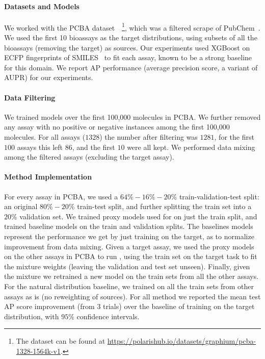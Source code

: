 \paragraph{Datasets and Models} We worked with the PCBA dataset~\citep{beaini2023towards}~\footnote{The dataset can be found at \url{https://polarishub.io/datasets/graphium/pcba-1328-1564k-v1}.}, which was a filtered scrape of PubChem~\citep{kim2016pubchem}. We used the first 10 bioassays as the target distributions, using subsets of all the bioassays (removing the target) as sources. Our experiments used XGBoost on ECFP fingerprints of SMILES~\citep{rogers2010extended} to fit each assay, known to be a strong  baseline~\citep{yang2019analyzing,seidl2023enhancing} for this domain. We report AP performance (average precision score, a variant of AUPR) for our experiments. 

\paragraph{Data Filtering} We trained models over the first 100,000 molecules in PCBA. We further removed any assay with no positive or negative instances among the first 100,000 molecules. For all assays ($1328$) the number after filtering was $1281$, for the first $100$ assays this left $86$, and the first $10$ were all kept. We performed data mixing among the filtered assays (excluding the target assay).

\paragraph{Method Implementation}  For every assay in PCBA, we used a $64\%-16\%-20\%$ train-validation-test split: an original $80\%-20\%$ train-test split, and further splitting the train set into a $20\%$ validation set. We trained proxy models used for \method on just the train split, and trained baseline models on the train and validation splits. The baselines models represent the performance we get by just training on the target, as to normalize improvement from data mixing. Given a target assay, we used the proxy models on the other assays in PCBA to run \method, using the train set on the target task to fit the \method mixture weights (leaving the validation and test set unseen). Finally, given the \method mixture we retrained a new model on the train sets from all the other assays. For the natural distribution baseline, we trained on all the train sets from other assays as is (no reweighting of sources). For all method we reported the mean test AP score improvement (from $3$ trials) over the baseline of training on the target distribution, with $95\%$ confidence intervals.




